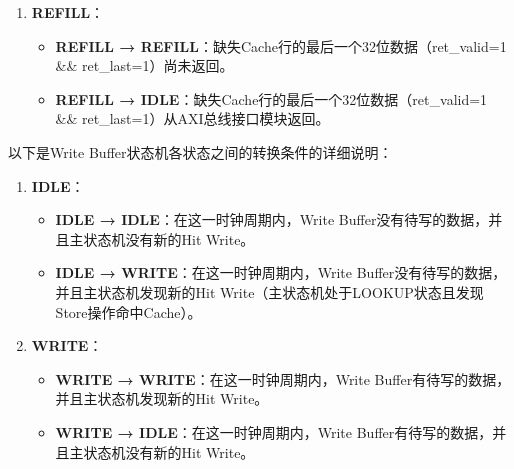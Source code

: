 \begin{enumerate}
  \begin{itemize}
  \tightlist
  \item
    \textbf{REPLACE → REPLACE}：AXI总线接口模块反馈rd\_rdy为0。刚进入REPLACE的第一时钟周期，会得到被替换的Cache行数据，并发起wr\_req送到AXI总线接口。由于wr\_rdy为1，故wr\_req一定会被接收。同时，对AXI总线发起缺失Cache的读请求。
  \item
    \textbf{REPLACE → REFILL}：AXI总线接口模块反馈rd\_rdy为1，表示对AXI总线发起的缺失Cache的读请求将被接收。
  \end{itemize}
\item
  \textbf{REFILL}：

  \begin{itemize}
  \tightlist
  \item
    \textbf{REFILL → REFILL}：缺失Cache行的最后一个32位数据（ret\_valid=1 \&\& ret\_last=1）尚未返回。
  \item
    \textbf{REFILL → IDLE}：缺失Cache行的最后一个32位数据（ret\_valid=1 \&\& ret\_last=1）从AXI总线接口模块返回。
  \end{itemize}
\end{enumerate}

以下是Write Buffer状态机各状态之间的转换条件的详细说明：

\begin{enumerate}
\def\labelenumi{\arabic{enumi}.}
\tightlist
\item
  \textbf{IDLE}：

  \begin{itemize}
  \tightlist
  \item
    \textbf{IDLE → IDLE}：在这一时钟周期内，Write Buffer没有待写的数据，并且主状态机没有新的Hit Write。
  \item
    \textbf{IDLE → WRITE}：在这一时钟周期内，Write Buffer没有待写的数据，并且主状态机发现新的Hit Write（主状态机处于LOOKUP状态且发现Store操作命中Cache）。
  \end{itemize}
\item
  \textbf{WRITE}：

  \begin{itemize}
  \tightlist
  \item
    \textbf{WRITE → WRITE}：在这一时钟周期内，Write Buffer有待写的数据，并且主状态机发现新的Hit Write。
  \item
    \textbf{WRITE → IDLE}：在这一时钟周期内，Write Buffer有待写的数据，并且主状态机没有新的Hit Write。
  \end{itemize}
\end{enumerate}

